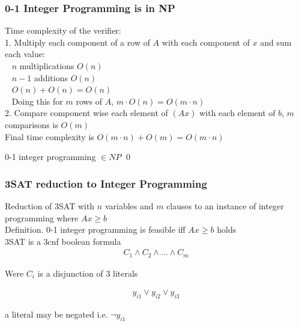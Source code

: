 \documentclass[mathserif]{beamer}
\begin{document}
\begin{frame}
\frametitle{0-1 Integer Programming is in NP}

Time complexity of the verifier:\\
1. Multiply each component of a row of $A$ with each component of $x$ and sum
each value:\\
~ $n$ multiplications $O(n)$\\
~ $n - 1$ additions $O(n)$\\
~ $O(n) + O(n) = O(n)$\\
~ Doing this for $m$ rows of $A$, $m \cdot O(n) = O(m \cdot n )$\\

2. Compare component wise each element of $(Ax)$ with each element of $b$, $m$
comparisons is $O(m)$\\

Final time complexity is $O(m \cdot n) + O(m) = O(m \cdot n)$

0-1 integer programming $\in \mathit{NP}$ \qed

\end{frame}

\begin{frame}
\frametitle{3SAT reduction to Integer Programming}

Reduction of 3SAT with $n$ variables and $m$ clauses to an instance of integer
programming where $Ax \geq b$\\

Definition. 0-1 integer programming is feasible iff $Ax \geq b$ holds\\

3SAT is a 3cnf boolean formula\\

\begin{align*}
C_1 \wedge C_2 \wedge \ldots \wedge C_m
\end{align*}

Were $C_i$ is a disjunction of 3 literals

\begin{align*}
	y_{i1} \vee y_{i2} \vee y_{i3}
\end{align*}

a literal may be negated i.e. $\neg y_{i1}$

\end{frame}
\end{document}
